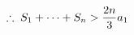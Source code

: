 \documentclass[preview]{standalone}
\begin{document}
\begin{align*}
\special{dvisvgm:raw <g id='unique000'>}\therefore\; S_1+\cdots+S_n>\frac{2n}{3}a_1\special{dvisvgm:raw </g>}
\end{align*}
\end{document}
